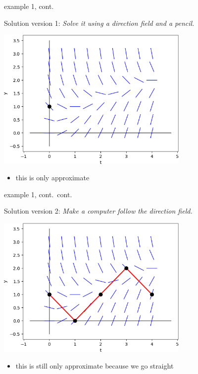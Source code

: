 \documentclass[colorlinks]{beamer}
\begin{document}
\begin{frame}{example 1, cont.}

Solution version 1: \emph{Solve it using a direction field and a pencil.}

\bigskip
\hfill \includegraphics[width=0.7\textwidth]{figs/sequence-1}

\begin{itemize}
\item this is only approximate
\end{itemize}
\end{frame}


\begin{frame}{example 1, cont.~cont.}

Solution version 2: \emph{Make a computer follow the direction field.}

\bigskip
\hfill \includegraphics[width=0.7\textwidth]{figs/sequence-2}

\begin{itemize}
\item this is still only approximate because we go straight
\end{itemize}
\end{frame}
\end{document}
